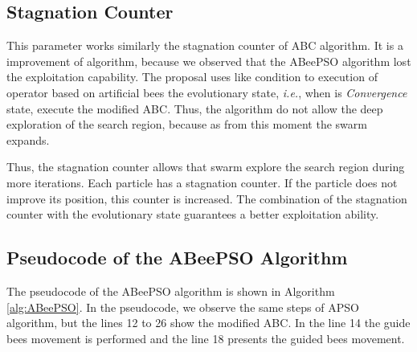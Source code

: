 \subsection{Stagnation Counter}
This parameter works similarly the stagnation counter of ABC algorithm. It is a improvement of algorithm, because we observed that the ABeePSO algorithm lost the exploitation capability. The proposal uses like condition to execution of operator based on artificial bees the evolutionary state, \emph{i.e.},  when is \emph{Convergence} state, execute the modified ABC. Thus, the algorithm do not allow the deep exploration of the search region, because as from this moment the swarm expands.

Thus, the stagnation counter allows that swarm explore the search region during more iterations. Each particle has a stagnation counter. If the particle does not improve its position, this counter is increased. The combination of the stagnation counter with the evolutionary state guarantees a better exploitation ability.

\subsection{Pseudocode of the ABeePSO Algorithm}
The pseudocode of the ABeePSO algorithm is shown in Algorithm \ref{alg:ABeePSO}. In the pseudocode, we observe the same steps of APSO algorithm, but the lines 12 to 26 show the modified ABC. In the line 14 the guide bees movement is performed and the line 18 presents the guided bees movement.

